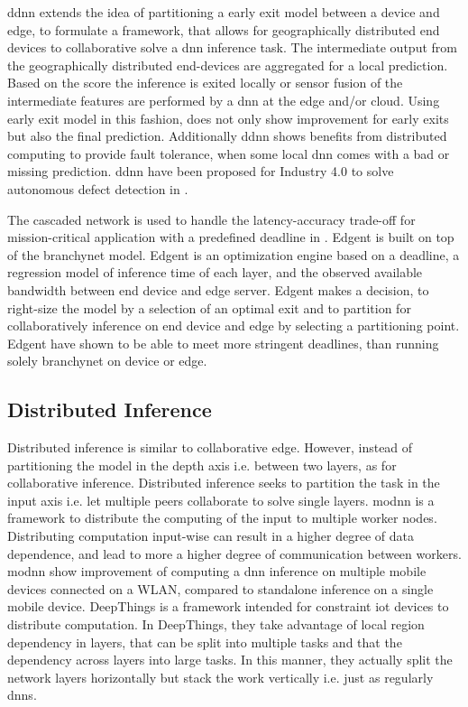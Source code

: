 \begin{enumdescript}
	\gls{ddnn} \cite{teerapittayanon_distributed_2017} extends the idea of partitioning a early exit model between a device and edge, to formulate a framework, that allows for geographically distributed end devices to collaborative solve a \gls{dnn} inference task. The intermediate output from the geographically distributed end-devices are aggregated for a local prediction. Based on the score the inference is exited locally or sensor fusion of the intermediate features are performed by a \gls{dnn} at the edge and/or cloud. Using early exit model in this fashion, does not only show improvement for early exits but also the final prediction. Additionally \gls{ddnn} shows benefits from distributed computing to provide fault tolerance, when some local \gls{dnn} comes with a bad or missing prediction. \gls{ddnn} have been proposed for Industry 4.0 to solve autonomous defect detection in \cite{li_deep_2018}. 
	
	The cascaded network is used to handle the latency-accuracy trade-off for mission-critical application with a predefined deadline in \cite{li_edge_2018}.  Edgent \cite{li_edge_2018} is built on top of the \gls{branchynet} model. Edgent is an optimization engine based on a deadline, a regression model of inference time of each layer, and the observed available bandwidth between end device and edge server. Edgent makes a decision, to right-size the model by a selection of an optimal exit and to partition for collaboratively inference on end device and edge by selecting a partitioning point. Edgent have shown to be able to meet more stringent deadlines, than running solely \gls{branchynet} on device or edge.
\end{enumdescript}

\subsection{Distributed Inference}

Distributed inference is similar to collaborative edge. However, instead of partitioning the model in the depth axis i.e. between two layers, as for collaborative inference. Distributed inference seeks to partition the task in the input axis i.e. let multiple peers collaborate to solve single layers. \gls{modnn} \cite{mao_modnn:_2017} is a framework to distribute the computing of the input to multiple worker nodes. Distributing computation input-wise can result in a higher degree of data dependence, and lead to more a higher degree of communication between workers. \gls{modnn} show improvement of computing a \gls{dnn} inference on multiple mobile devices connected on a WLAN, compared to standalone inference on a single mobile device. DeepThings \cite{zhao_deepthings:_2018} is a framework intended for constraint \gls{iot} devices to distribute computation. In DeepThings, they take advantage of local region dependency in layers, that can be split into multiple tasks and that the dependency across layers into large tasks. In this manner, they actually split the network layers horizontally but stack the work vertically i.e. just as regularly \gls{dnn}s.